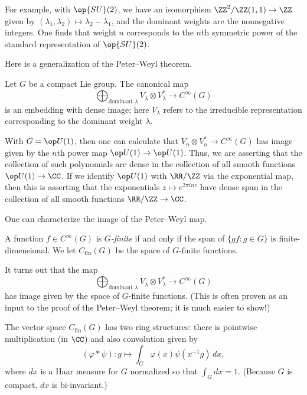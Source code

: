\documentclass[../notes.tex]{subfiles}
\begin{document}
\begin{example}
	For example, with $\op{SU}(2)$, we have an isomorphism $\ZZ^2/\ZZ(1,1)\to\ZZ$ given by $(\lambda_1,\lambda_2)\mapsto\lambda_2-\lambda_1$, and the dominant weights are the nonnegative integers. One finds that weight $n$ corresponds to the $n$th symmetric power of the standard representation of $\op{SU}(2)$.
\end{example}
Here is a generalization of the Peter--Weyl theorem.
\begin{theorem}
	Let $G$ be a compact Lie group. The canonical map
	\[\bigoplus_{\text{dominant }\lambda}V_\lambda\otimes V_\lambda^*\to C^\infty(G)\]
	is an embedding with dense image; here $V_\lambda$ refers to the irreducible representation corresponding to the dominant weight $\lambda$.
\end{theorem}
\begin{example}
	With $G=\op U(1)$, then one can calculate that $V_n\otimes V_n^*\to C^\infty(G)$ has image given by the $n$th power map $\op U(1)\to\op U(1)$. Thus, we are asserting that the collection of such polynomials are dense in the collection of all smooth functions $\op U(1)\to\CC$. If we identify $\op U(1)$ with $\RR/\ZZ$ via the exponential map, then this is asserting that the exponentials $z\mapsto e^{2\pi inz}$ have dense span in the collection of all smooth functions $\RR/\ZZ\to\CC$.
\end{example}
One can characterize the image of the Peter--Weyl map.
\begin{definition}[finite]
	A function $f\in C^\infty(G)$ is \textit{$G$-finite} if and only if the span of $\{gf:g\in G\}$ is finite-dimensional. We let $C_{\mathrm{fin}}(G)$ be the space of $G$-finite functions.
\end{definition}
\begin{remark}
	It turns out that the map
	\[\bigoplus_{\text{dominant }\lambda}V_\lambda\otimes V_\lambda^*\to C^\infty(G)\]
	has image given by the space of $G$-finite functions. (This is often proven as an input to the proof of the Peter--Weyl theorem; it is much easier to show!)
\end{remark}
\begin{remark}
	The vector space $C_{\mathrm{fin}}(G)$ has two ring structures: there is pointwise multiplication (in $\CC$) and also convolution given by
	\[(\varphi*\psi)\colon g\mapsto\int_G\varphi(x)\psi\left(x^{-1}g\right)\,dx,\]
	where $dx$ is a Haar measure for $G$ normalized so that $\int_Gdx=1$. (Because $G$ is compact, $dx$ is bi-invariant.)
\end{remark}
\end{document}
